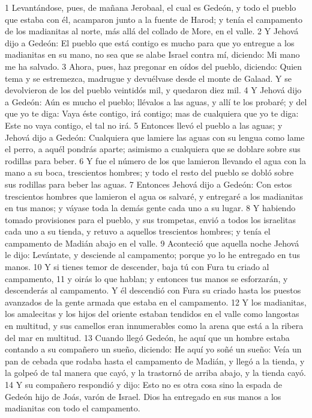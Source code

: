 1 Levantándose, pues, de mañana Jerobaal, el cual es Gedeón, y todo el pueblo que estaba con él, acamparon junto a la fuente de Harod; y tenía el campamento de los madianitas al norte, más allá del collado de More, en el valle.
2 Y Jehová dijo a Gedeón: El pueblo que está contigo es mucho para que yo entregue a los madianitas en su mano, no sea que se alabe Israel contra mí, diciendo: Mi mano me ha salvado.
3 Ahora, pues, haz pregonar en oídos del pueblo, diciendo: Quien tema y se estremezca, madrugue y devuélvase desde el monte de Galaad. Y se devolvieron de los del pueblo veintidós mil, y quedaron diez mil.
4 Y Jehová dijo a Gedeón: Aún es mucho el pueblo; llévalos a las aguas, y allí te los probaré; y del que yo te diga: Vaya éste contigo, irá contigo; mas de cualquiera que yo te diga: Este no vaya contigo, el tal no irá.
5 Entonces llevó el pueblo a las aguas; y Jehová dijo a Gedeón: Cualquiera que lamiere las aguas con su lengua como lame el perro, a aquél pondrás aparte; asimismo a cualquiera que se doblare sobre sus rodillas para beber. 
6 Y fue el número de los que lamieron llevando el agua con la mano a su boca, trescientos hombres; y todo el resto del pueblo se dobló sobre sus rodillas para beber las aguas.
7 Entonces Jehová dijo a Gedeón: Con estos trescientos hombres que lamieron el agua os salvaré, y entregaré a los madianitas en tus manos; y váyase toda la demás gente cada uno a su lugar.
8 Y habiendo tomado provisiones para el pueblo, y sus trompetas, envió a todos los israelitas cada uno a su tienda, y retuvo a aquellos trescientos hombres; y tenía el campamento de Madián abajo en el valle.
9 Aconteció que aquella noche Jehová le dijo: Levántate, y desciende al campamento; porque yo lo he entregado en tus manos.
10 Y si tienes temor de descender, baja tú con Fura tu criado al campamento,
11 y oirás lo que hablan; y entonces tus manos se esforzarán, y descenderás al campamento. Y él descendió con Fura su criado hasta los puestos avanzados de la gente armada que estaba en el campamento.
12 Y los madianitas, los amalecitas y los hijos del oriente estaban tendidos en el valle como langostas en multitud, y sus camellos eran innumerables como la arena que está a la ribera del mar en multitud.
13 Cuando llegó Gedeón, he aquí que un hombre estaba contando a su compañero un sueño, diciendo: He aquí yo soñé un sueño: Veía un pan de cebada que rodaba hasta el campamento de Madián, y llegó a la tienda, y la golpeó de tal manera que cayó, y la trastornó de arriba abajo, y la tienda cayó.
14 Y su compañero respondió y dijo: Esto no es otra cosa sino la espada de Gedeón hijo de Joás, varón de Israel. Dios ha entregado en sus manos a los madianitas con todo el campamento.
